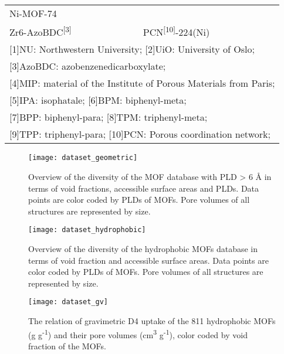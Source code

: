\begin{table}[H]
\begin{tabular}{@{}llll@{}}
        Ni-MOF-74 & \citep{zhengMolecularInsightFluorocarbon2020}\\
        Zr6-AzoBDC\textsuperscript{{[}3{]}} & \citep{soaresComputationalEvaluationChemical2019} &
        PCN\textsuperscript{{[}10{]}}-224(Ni) & \citep{fengConstructionUltrastablePorphyrin2013}\\
        \bottomrule
        \multicolumn{4}{l}{{[}1{]}NU: Northwestern University; {[}2{]}UiO: University of Oslo;}\\
        \multicolumn{4}{l}{{[}3{]}AzoBDC: azobenzenedicarboxylate;}\\
        \multicolumn{4}{l}{{[}4{]}MIP: material of the Institute of Porous Materials from Paris;}\\
        \multicolumn{4}{l}{{[}5{]}IPA: isophatale; {[}6{]}BPM: biphenyl-meta;}\\
        \multicolumn{4}{l}{{[}7{]}BPP: biphenyl-para; {[}8{]}TPM: triphenyl-meta;}\\
        \multicolumn{4}{l}{{[}9{]}TPP: triphenyl-para; {[}10{]}PCN: Porous coordination network;}\\
    \end{tabular}
\end{table}

\begin{figure}[H]
    \centering
    \texttt{[image: dataset\_geometric]}
    \caption{%
        Overview of the diversity of the MOF database with
        PLD > 6 Å in terms of void fractions, accessible surface
        areas and PLDs. Data points are color coded by PLDs of MOFs. Pore
        volumes of all structures are represented by size.
    }\label{fig:d4-screening-geometric}
\end{figure}

\begin{figure}[H]
    \centering
    \texttt{[image: dataset\_hydrophobic]}
    \caption{%
        Overview of the diversity of the hydrophobic MOFs
        database in terms of void fraction and accessible surface areas. Data
        points are color coded by PLDs of MOFs. Pore volumes of all structures
        are represented by size.
    }\label{fig:d4-screening-hydrophobic}
\end{figure}

\begin{figure}[H]
    \centering
    \texttt{[image: dataset\_gv]}
    \caption{%
        The relation of gravimetric D4 uptake of the 811 hydrophobic MOFs
        (g g\textsuperscript{-1}) and their pore volumes
        (cm\textsuperscript{3} g\textsuperscript{-1}), color coded by void fraction of the
        MOFs.
    }\label{fig:d4-screening-grav-volum}
\end{figure}

